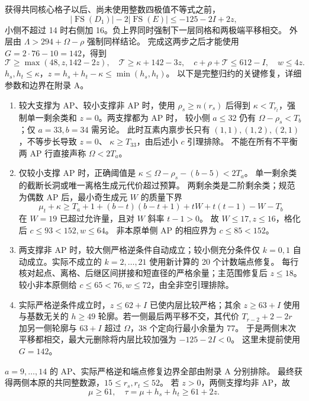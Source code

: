 \documentclass[11pt,a4paper]{article}
\newcommand{\FS}{\operatorname{FS}}
\begin{document}
获得共同核心格子以后、尚未使用整数四极值不等式之前，
\[
 |\FS(D_1)|-2|\FS(E)|\le-125-2I+2z,
\]
小侧不超过 14 时右侧加 16。负上界同时强制下一层同格和两极端平移相交。
外层由 $\Lambda>294+\Omega-\rho$ 强制同样结论。
完成这两步之后才能使用 $G=2\cdot76-10=142$，得到
\begin{equation}\label{eq:structural}
 \mathcal T\ge\max(48,z,142-2z),\quad
 \mathcal T\ge\kappa+142-3z,\quad c+\rho+\mathcal T\le612-I,
 \quad w\le4z.
\end{equation}
$h_s,h_t\le\kappa$，$z=h_s+h_t-\kappa\le\min(h_s,h_t)$。
以下是完整归约的关键修复，详细参数和边界在附录 A。

\begin{enumerate}
\item 较大支撑为 AP、较小支撑非 AP 时，使用 $\rho_s\ge n(r_s)$ 后得到
$\kappa<T_{r_t}$，强制单一剩余类和 $z=0$。两支撑都为 AP 时，
较小侧 $a\le32$ 仍有 $\Omega-\rho_s<T_b$；仅 $a=33,b=34$ 需另论。
此时互素内禀步长只有 $(1,1),(1,2),(2,1)$，不等步长导致 $z=0$、
$\kappa\ge T_{33}$，由后述小 $c$ 引理排除。
不能在所有不平衡两 AP 行直接声称 $\Omega<2T_a$。
\item 仅较小支撑 AP 时，正确阈值是
$\kappa\le\Omega-\rho_s-(b-5)<2T_a$。
单一剩余类的截断长洞或唯一离格生成元代价超过预算。
两剩余类是二阶剩余类；规范为偶数 AP 后，最小奇生成元 $W$ 的质量下界
\[
 \mu_t+\kappa\ge T_a+1+(b-t)(b-t+1)+tW+t(t-1)-W-T_b
\]
在 $W=19$ 已超过允许量，且对 $W$ 斜率 $t-1>0$。
故 $W\le17,z\le16$，格化后 $c\le93<152,w\le64$。
非本原单侧 AP 的相应界为 $c\le85<152$。
\item 两支撑非 AP 时，较大侧严格逆条件自动成立；较小侧充分条件仅 $k=0,1$
自动成立。实际不成立的 $k=2,\ldots,21$ 使用新计算的 20 个计数端点修复。
每行核对起点、离格、后继区间拼接和短直径的严格余量；主范围修复后 $z\le18$。
较小非本原侧给 $c\le65<76,w\le72$，由全非空引理排除。
\item 实际严格逆条件成立时，$z\le62+I$ 已使内层比较严格；其余 $z\ge63+I$
使用与基数无关的 $h\ge49$ 轮廓。若一侧最后两平移不交，其代价
$T_{r-2}+2-2r$ 加另一侧轮廓与 $63+I$ 超过 $\Omega$，38 个定向行最小余量为 77。
于是两侧末次平移都相交，最大元删除将内层比较加强为 $-125-2I<0$。
这里未提前使用 $G=142$。
\end{enumerate}
$a=9,\ldots,14$ 的 AP、实际严格逆和端点修复边界全部由附录 A 分别排除。
最终获得两侧本原的共同整数源，$15\le r_s,r_t\le52$。
若 $z>0$，两侧支撑均非 AP，故
\begin{equation}\label{eq:positivefloor}
 \mu\ge61,\quad \tau=\mu+h_s+h_t\ge61+2z.
\end{equation}
\end{document}
